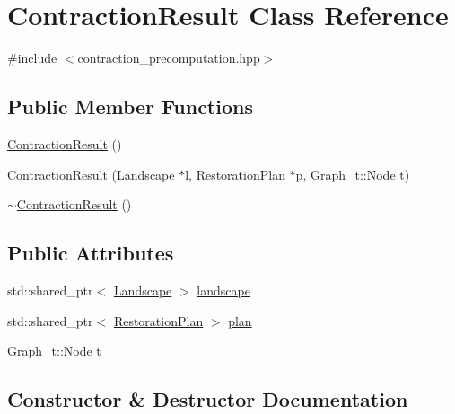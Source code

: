 \hypertarget{class_contraction_result}{}\section{Contraction\+Result Class Reference}
\label{class_contraction_result}


{\ttfamily \#include $<$contraction\+\_\+precomputation.\+hpp$>$}

\subsection*{Public Member Functions}
\begin{DoxyCompactItemize}
\item 
\hyperlink{class_contraction_result_ac4942aaf3506bbd80a7b8bf1f9d070fe}{Contraction\+Result} ()
\item 
\hyperlink{class_contraction_result_aa63254d104eb42e70978a6a864ce350e}{Contraction\+Result} (\hyperlink{class_landscape}{Landscape} $\ast$l, \hyperlink{class_restoration_plan}{Restoration\+Plan} $\ast$p, Graph\+\_\+t\+::\+Node \hyperlink{class_contraction_result_a73086d90a83967d2cf24c7dd9fc83cd9}{t})
\item 
\hyperlink{class_contraction_result_a2fc9653548df2d9499388f1af8280615}{$\sim$\+Contraction\+Result} ()
\end{DoxyCompactItemize}
\subsection*{Public Attributes}
\begin{DoxyCompactItemize}
\item 
std\+::shared\+\_\+ptr$<$ \hyperlink{class_landscape}{Landscape} $>$ \hyperlink{class_contraction_result_ab2693f752e287b3f6d031e80f0368240}{landscape}
\item 
std\+::shared\+\_\+ptr$<$ \hyperlink{class_restoration_plan}{Restoration\+Plan} $>$ \hyperlink{class_contraction_result_aa684d24bad0d74858c604bb4dc070aa3}{plan}
\item 
Graph\+\_\+t\+::\+Node \hyperlink{class_contraction_result_a73086d90a83967d2cf24c7dd9fc83cd9}{t}
\end{DoxyCompactItemize}


\subsection{Constructor \& Destructor Documentation}
\mbox{\label{class_contraction_result_ac4942aaf3506bbd80a7b8bf1f9d070fe}} 
